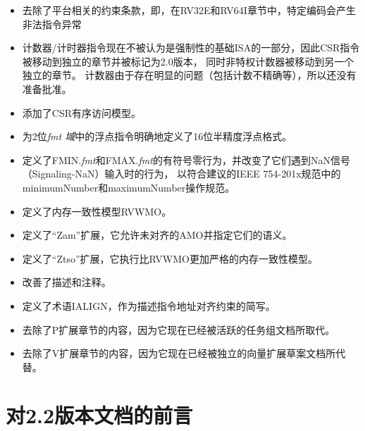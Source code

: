 \begin{itemize}
\item 去除了平台相关的约束条款，即，在RV32E和RV64I章节中，特定编码会产生非法指令异常

\item 计数器/计时器指令现在不被认为是强制性的基础ISA的一部分，因此CSR指令被移动到独立的章节并被标记为2.0版本，
同时非特权计数器被移动到另一个独立的章节。
计数器由于存在明显的问题（包括计数不精确等），所以还没有准备批准。

\item 添加了CSR有序访问模型。

\item 为2位{\em fmt 域}中的浮点指令明确地定义了16位半精度浮点格式。

\item 定义了FMIN.{\em fmt}和FMAX.{\em fmt}的有符号零行为，并改变了它们遇到NaN信号（Signaling-NaN）输入时的行为，
以符合建议的IEEE 754-201x规范中的minimumNumber和maximumNumber操作规范。

\item 定义了内存一致性模型RVWMO。

\item 定义了“Zam”扩展，它允许未对齐的AMO并指定它们的语义。

\item 定义了“Ztso”扩展，它执行比RVWMO更加严格的内存一致性模型。

\item 改善了描述和注释。

\item 定义了术语IALIGN，作为描述指令地址对齐约束的简写。

\item 去除了P扩展章节的内容，因为它现在已经被活跃的任务组文档所取代。

\item 去除了V扩展章节的内容，因为它现在已经被独立的向量扩展草案文档所代替。

\end{itemize}

\FloatBarrier

\section*{对2.2版本文档的前言}

